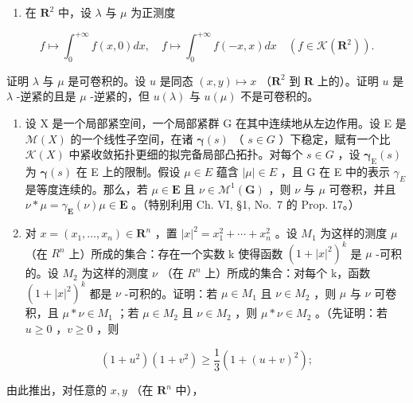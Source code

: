 \exercisesection{}

\begin{enumerate}
\def\labelenumi{\arabic{enumi})}
\tightlist
\item
  在 \(\mathbf{R}^2\) 中，设 \(\lambda\) 与 \(\mu\) 为正测度
\end{enumerate}

\[
f \mapsto \int_ {0} ^ {+ \infty} f (x, 0) d x, \quad f \mapsto \int_ {0} ^ {+ \infty} f (- x, x) d x \quad \left(f \in \mathcal {K} (\mathbf {R} ^ {2})\right).
\]

证明 \(\lambda\) 与 \(\mu\) 是可卷积的。设 \(u\) 是同态 \((x,y) \mapsto x\) （\(\mathbf{R}^2\) 到 \(\mathbf{R}\) 上的）。证明 \(u\) 是 \(\lambda\) -逆紧的且是 \(\mu\) -逆紧的，但 \(u(\lambda)\) 与 \(u(\mu)\) 不是可卷积的。

\begin{enumerate}
\def\labelenumi{\arabic{enumi})}
\setcounter{enumi}{1}
\item
  设 X 是一个局部紧空间，一个局部紧群 G 在其中连续地从左边作用。设 E 是 \(\mathcal{M}(X)\) 的一个线性子空间，在诸 \(\boldsymbol{\gamma}(s)\) （ \(s \in G\) ）下稳定，赋有一个比 \(\mathcal{K}(X)\) 中紧收敛拓扑更细的拟完备局部凸拓扑。对每个 \(s \in G\) ，设 \(\boldsymbol{\gamma}_{\mathrm{E}}(s)\) 为 \(\boldsymbol{\gamma}(s)\) 在 E 上的限制。假设 \(\mu \in E\) 蕴含 \(|\mu| \in E\) ，且 G 在 E 中的表示 \(\gamma_{E}\) 是等度连续的。那么，若 \(\mu \in \mathbf{E}\) 且 \(\nu \in \mathcal{M}^1 (\mathbf{G})\) ，则 \(\nu\) 与 \(\mu\) 可卷积，并且 \(\nu * \mu = \gamma_{\mathbf{E}}(\nu)\mu \in \mathbf{E}\) 。（特别利用 Ch. VI, §1, No.~7 的 Prop. 17。）
\item
  对 \(x = (x_{1}, \ldots, x_{n}) \in \mathbf{R}^{n}\) ，置 \(|x|^{2} = x_{1}^{2} + \cdots + x_{n}^{2}\) 。设 \(M_{1}\) 为这样的测度 \(\mu\) （在 \(R^{n}\) 上）所成的集合：存在一个实数 k 使得函数 \((1 + |x|^{2})^{k}\) 是 \(\mu\) -可积的。设 \(M_{2}\) 为这样的测度 \(\nu\) （在 \(R^{n}\) 上）所成的集合：对每个 k，函数 \((1 + |x|^{2})^{k}\) 都是 \(\nu\) -可积的。证明：若 \(\mu \in M_{1}\) 且 \(\nu \in M_{2}\) ，则 \(\mu\) 与 \(\nu\) 可卷积，且 \(\mu * \nu \in M_{1}\) ；若 \(\mu \in M_{2}\) 且 \(\nu \in M_{2}\) ，则 \(\mu * \nu \in M_{2}\) 。（先证明：若 \(u \geqslant 0\) ，\(v \geqslant 0\) ，则
\end{enumerate}

\[
(1 + u ^ {2}) (1 + v ^ {2}) \geqslant \frac {1}{3} (1 + (u + v) ^ {2});
\]

由此推出，对任意的 \(x, y\) （在 \(\mathbf{R}^n\) 中），

